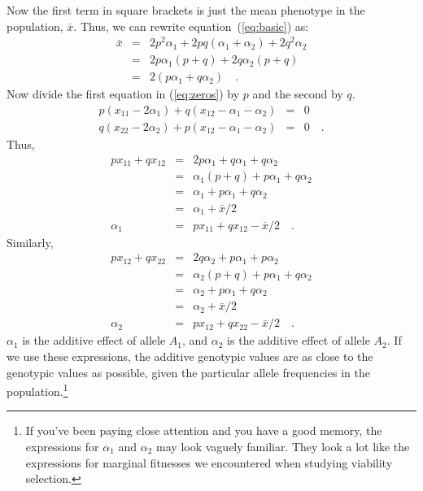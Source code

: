 \documentclass[12pt]{article}
\begin{document}
Now the first term in square brackets is just the mean phenotype in
the population, $\bar x$.  Thus, we can rewrite
equation~(\ref{eq:basic}) as:
\begin{eqnarray}
{\bar x} &=& 2p^2\alpha_1 + 2pq(\alpha_1 + \alpha_2)
                        +2q^2\alpha_2 \nonumber \\
                     &=& 2p\alpha_1(p+q) + 2q\alpha_2(p+q) \nonumber \\
                     &=& 2(p\alpha_1 + q\alpha_2) \quad . \label{eq:alpha_bar}
\end{eqnarray}
Now divide the first equation in (\ref{eq:zeros}) by $p$ and the
second by $q$.
\begin{eqnarray}
p(x_{11} - 2\alpha_1) + q(x_{12} - \alpha_1 - \alpha_2) &=& 0
\label{eq:zeros_divide_1} \\
q(x_{22} - 2\alpha_2) + p(x_{12} - \alpha_1 - \alpha_2) &=& 0 \quad
. \label{eq:zeros_divide_2}
\end{eqnarray}
Thus,
\begin{eqnarray*}
px_{11} + qx_{12} &=& 2p\alpha_1 + q\alpha_1 + q\alpha_2 \\
 &=& \alpha_1(p + q) + p\alpha_1 + q\alpha_2 \\
 &=& \alpha_1 + p\alpha_1 + q\alpha_2 \\
 &=& \alpha_1 + {\bar x}/2 \\
\alpha_1 &=& px_{11} + qx_{12} - {\bar x}/2 \quad .
\end{eqnarray*}
Similarly,
\begin{eqnarray*}
px_{12} + qx_{22} &=& 2q\alpha_2 + p\alpha_1 + p\alpha_2 \\
 &=& \alpha_2(p + q) + p\alpha_1 + q\alpha_2 \\
 &=& \alpha_2 + p\alpha_1 + q\alpha_2 \\
 &=& \alpha_2 + {\bar x}/2 \\
\alpha_2 &=& px_{12} + qx_{22} - {\bar x}/2 \quad .
\end{eqnarray*}
$\alpha_1$ is the additive effect of allele $A_1$, and $\alpha_2$ is
the additive effect of allele $A_2$. If we use these expressions, the
additive genotypic values are as close to the genotypic values as
possible, given the particular allele frequencies in the
population.\footnote{If you've been paying close attention and you
  have a good memory, the expressions for $\alpha_1$ and $\alpha_2$
  may look vaguely familiar. They look a lot like the expressions for
  marginal fitnesses we encountered when studying viability
  selection.}
\end{document}
